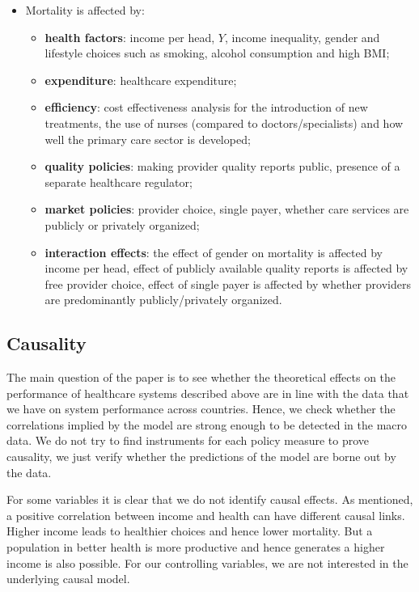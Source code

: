 \documentclass[12pt,english,a4paper]{article}
\begin{document}
\begin{itemize}
\item Mortality is affected by:
\begin{itemize}
\item \textbf{health factors}:  income per head, \(Y\), income inequality, gender and lifestyle choices such as smoking, alcohol consumption and high BMI;
\item \textbf{expenditure}: healthcare expenditure;
\item \textbf{efficiency}: cost effectiveness analysis for the introduction of new treatments, the use of nurses (compared to doctors/specialists) and how well the primary care sector is developed;
\item \textbf{quality policies}: making provider quality reports public, presence of a separate healthcare regulator;
\item \textbf{market policies}: provider choice, single payer, whether care services are publicly or privately organized;
\item \textbf{interaction effects}: the effect of gender on mortality is affected by income per head, effect of publicly available quality reports is affected by free provider choice, effect of single payer is affected by whether providers are predominantly publicly/privately organized.
\end{itemize}
\end{itemize}

\subsection{Causality}
\label{sec:org76ede3d}

The main question of the paper is to see whether the theoretical effects on the performance of healthcare systems described above are in line with the data that we have on system performance across countries. Hence, we check whether the correlations implied by the model are strong enough to be detected in the macro data. We do not try to find instruments for each policy measure to prove causality, we just verify whether the predictions of the model are borne out by the data.

For some variables it is clear that we do not identify causal effects. As mentioned, a positive correlation between income and health can have different causal links. Higher income leads to healthier choices and hence lower mortality. But a population in better health is more productive and hence generates a higher income is also possible. For our controlling variables, we are not interested in the underlying causal model.
\end{document}
